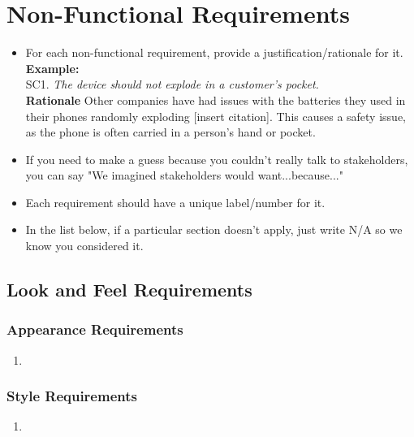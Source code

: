 \documentclass[]{article}
\begin{document}

\section{Non-Functional Requirements}
\label{sec:non-functional_requirements}


\begin{itemize}
	\item For each non-functional requirement, provide a justification/rationale for it.\\
	      {\bf Example:} \\
	      SC1. \emph{The device should not explode in a customer’s pocket.}\\
	      {\bf Rationale} Other companies have had issues with the batteries they used in their phones randomly exploding [insert citation]. This causes a safety issue, as the phone is often carried in a person's hand or pocket.
	\item If you need to make a guess because you couldn't really talk to stakeholders, you can say "We imagined stakeholders would want...because..."
	\item Each requirement should have a unique label/number for it.
	\item In the list below, if a particular section doesn't apply, just write N/A so we know you considered it.
\end{itemize}

\subsection{Look and Feel Requirements}
\label{sub:look_and_feel_requirements}

\subsubsection{Appearance Requirements}
\label{ssub:appearance_requirements}
\begin{enumerate}[{LF-A}1. ]
	\item
\end{enumerate}

\subsubsection{Style Requirements}
\label{ssub:style_requirements}
\begin{enumerate}[{LF-S}1. ]
	\item
\end{enumerate}
\end{document}

